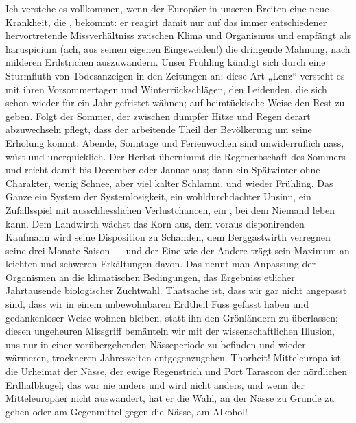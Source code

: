 Ich verstehe es vollkommen, wenn der Europäer in unseren Breiten eine neue Krankheit, die , bekommt: er reagirt damit nur auf das immer entschiedener hervortretende Missverhältniss zwischen Klima und Organismus und empfängt als haruspicium (ach, aus seinen eigenen Eingeweiden!) die dringende Mahnung, nach milderen Erdstrichen auszuwandern. Unser Frühling kündigt sich durch eine Sturmfluth von Todesanzeigen in den Zeitungen an; diese Art „Lenz“ versteht es mit ihren Vorsommertagen und Winterrückschlägen, den Leidenden, die sich schon wieder für ein Jahr gefristet wähnen; auf heimtückische Weise den Rest zu geben. Folgt der Sommer, der zwischen dumpfer Hitze und Regen derart abzuwechseln pflegt, dass der arbeitende Theil der Bevölkerung um seine Erholung kommt: Abende, Sonntage und Ferienwochen sind unwiderruflich nass, wüst und unerquicklich. Der Herbst übernimmt die Regenerbschaft des Sommers und reicht damit bis December oder Januar aus; dann ein Spätwinter ohne Charakter, wenig Schnee, aber viel kalter Schlamm, und wieder Frühling. Das Ganze ein System der Systemlosigkeit, ein wohldurchdachter Unsinn, ein Zufallsspiel mit ausschliesslichen Verlustchancen, ein , bei dem Niemand leben kann. Dem Landwirth wächst das Korn aus, dem voraus disponirenden Kaufmann wird seine Disposition zu Schanden, dem Berggastwirth verregnen seine drei Monate Saison — und der Eine wie der Andere trägt sein Maximum an leichten und schweren Erkältungen davon. Das nennt man Anpassung der Organismen an die klimatischen Bedingungen, das Ergebniss etlicher Jahrtausende biologischer Zuchtwahl. Thatsache ist, dass wir gar nicht angepasst sind, dass wir in einem unbewohnbaren Erdtheil Fuss gefasst haben und gedankenloser Weise wohnen bleiben, statt ihn den Grönländern zu überlassen; diesen ungeheuren Missgriff bemänteln wir mit der wissenschaftlichen Illusion, uns nur in einer vorübergehenden Nässeperiode zu befinden und wieder wärmeren, trockneren Jahreszeiten entgegenzugehen. Thorheit! Mitteleuropa ist die Urheimat der Nässe, der ewige Regenstrich und Port Tarascon der nördlichen Erdhalbkugel; das war nie anders und wird nicht anders, und wenn der Mitteleuropäer nicht auswandert, hat er die Wahl, an der Nässe zu Grunde zu gehen oder am Gegenmittel gegen die Nässe, am Alkohol!
\par

